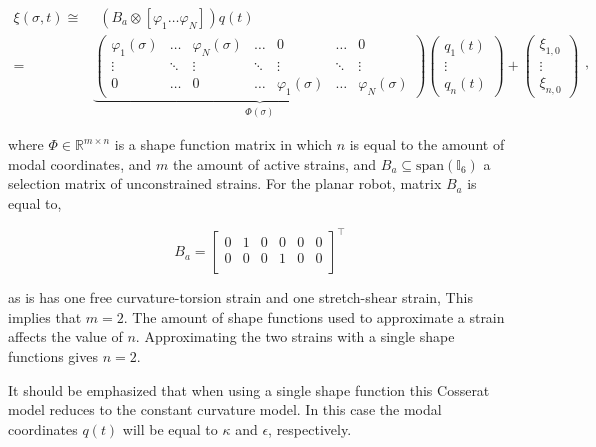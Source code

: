 
\begin{equation}
\begin{aligned}
    \xi(\sigma,t) \cong & \hspace{5pt}  (B_a \otimes [ \varphi_1 \dots \varphi_N ])q(t)\\ = &  \underbrace{ \begin{pmatrix}
    \varphi_1(\sigma) & \dots  & \varphi_N(\sigma) & \dots     & 0      & \dots  &  0 \\
    \vdots    & \ddots & \vdots    & \ddots    & \vdots & \ddots & \vdots \\
    0         & \dots  & 0         & \dots     & \varphi_1(\sigma) & \dots & \varphi_N (\sigma)
    \end{pmatrix}}_{\Phi(\sigma)} \begin{pmatrix} q_1(t) \\ \vdots \\ q_n(t) \end{pmatrix} +  \begin{pmatrix} \xi_{1,0} \\ \vdots \\ \xi_{n,0}   \end{pmatrix}
    \end{aligned},
\label{eq2:xishape}
\end{equation}

where $\Phi \in \mathbb{R}^{m \times n}$ is a shape function matrix in which $n$ is equal to the amount of modal coordinates, and $m$ the amount of active strains, and $B_a \subseteq \text{span}(\mathbb{I}_6)$ a selection matrix of unconstrained strains. For the planar robot, matrix $B_a$ is equal to,

\begin{equation}
    B_a = \begin{bmatrix}
    0 & 1 & 0 & 0 & 0 & 0 \\
    0 & 0 & 0 & 1 & 0 & 0 \\
    \end{bmatrix}^\top
\end{equation}

as is has one free curvature-torsion strain and one stretch-shear strain, This implies that $m = 2$. The amount of shape functions used to approximate a strain affects the value of $n$. Approximating the two strains with a single shape functions gives $n = 2$. 

It should be emphasized that when using a single shape function this Cosserat model reduces to the constant curvature model. In this case the modal coordinates $q(t)$ will be equal to $\kappa$ and $\epsilon$, respectively. 

